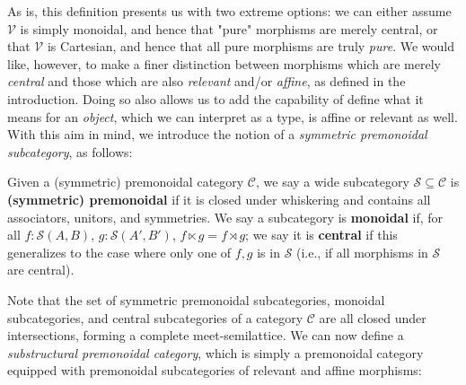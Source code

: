\documentclass[acmsmall,screen,review]{acmart}
\newcommand{\mc}[1]{\ensuremath{\mathcal{#1}}}
\newcommand{\mb}[1]{\ensuremath{\mathbf{#1}}}
\newcommand{\ms}[1]{\ensuremath{\mathsf{#1}}}
\begin{document}
As is, this definition presents us with two extreme options: we can either
assume \(\mc{V}\) is simply monoidal, and hence that "pure" morphisms are merely
central, or that \(\mc{V}\) is Cartesian, and hence that all pure morphisms are
truly \textit{pure}. We would like, however, to make a finer distinction between
morphisms which are merely \textit{central} and those which are also
\textit{relevant} and/or \textit{affine}, as defined in the introduction. Doing
so also allows us to add the capability of define what it means for an
\textit{object}, which we can interpret as a type, is affine or relevant as
well. With this aim in mind, we introduce the notion of a \textit{symmetric
premonoidal subcategory}, as follows:
\begin{definition}
  Given a (symmetric) premonoidal category \(\mc{C}\), we say a wide subcategory
  \(\mc{S} \subseteq \mc{C}\) is \textbf{(symmetric) premonoidal} if it is
  closed under whiskering and contains all associators, unitors, and symmetries.
  We say a subcategory is \textbf{monoidal} if, for all \(f: \mc{S}(A, B)\),
  \(g: \mc{S}(A', B')\), \(f \ltimes g = f \rtimes g\); we say it is
  \textbf{central} if this generalizes to the case where only one of \(f, g\) is
  in \(\mc{S}\) (i.e., if all morphisms in \(\mc{S}\) are central).
\end{definition} 
Note that the set of symmetric premonoidal subcategories, monoidal
subcategories, and central subcategories of a category \(\mc{C}\) are all closed
under intersections, forming a complete meet-semilattice.
%
%
%
We can now define a \textit{substructural premonoidal category}, which is simply
a premonoidal category equipped with premonoidal subcategories of relevant and
affine morphisms:
\end{document}
